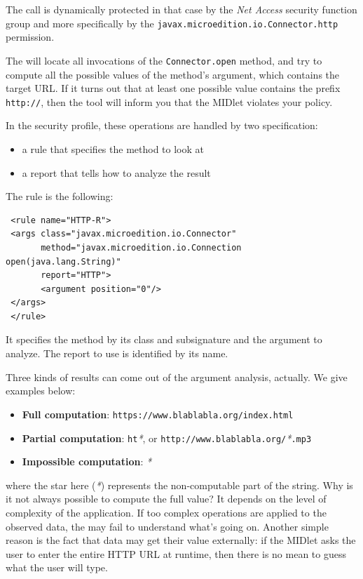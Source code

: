 The call is dynamically protected in that case by the \emph{Net Access} 
security function group and more specifically by the 
\verb!javax.microedition.io.Connector.http! permission.

The \ma  will locate all invocations of the \texttt{Connector.open}
method, and try to
compute all the possible values of the method's argument, which
contains the target URL. If it turns out that at least one possible
value contains the prefix \texttt{http://}, then the tool will inform
you that the MIDlet violates your policy.

In the security profile, these operations are handled by two specification:
\begin{itemize}
  \item a rule that specifies the method to look at
  \item a report that tells how to analyze the result
 \end{itemize}
The rule is the following:
 \begin{verbatim}
 <rule name="HTTP-R">
 <args class="javax.microedition.io.Connector"
       method="javax.microedition.io.Connection open(java.lang.String)"
       report="HTTP">
       <argument position="0"/>
 </args>
 </rule>
\end{verbatim}
It specifies the method by its class and subsignature and the argument to
analyze. The report to use is identified by its name.

Three kinds of results can
come out of the argument analysis, actually. We give examples below:
\begin{itemize}
\item{\textbf{Full computation}}: \texttt{https://www.blablabla.org/index.html}
\item{\textbf{Partial computation}}: \texttt{ht}\emph{*}, or
  \texttt{http://www.blablabla.org/}\emph{*}\texttt{.mp3}
\item{\textbf{Impossible computation}}: \emph{*}
\end{itemize}

where the star here (\emph{*}) represents the non-computable part of the
string. Why is it not always possible to compute the full value?
It depends on the level of complexity of the application. If too
complex operations are applied to the observed data, the \ma may fail
to understand what's going on. Another simple reason is the fact that 
data may get their value externally: if the MIDlet asks the user to 
enter the entire HTTP URL at runtime, then there is no mean to guess what the
user will type.

